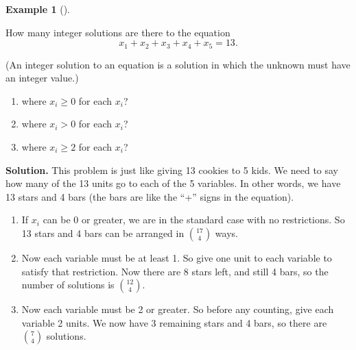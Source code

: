 \documentclass[10pt,]{book}
\theoremstyle{plain}
\theoremstyle{definition}
\newtheorem{example}[theorem]{Example}
\theoremstyle{definition}
\theoremstyle{definition}
\numberwithin{equation}{section}
\begin{document}
\begin{example}[]\label{example-44}

How many integer solutions are there to the equation
\begin{equation*}
  x_1 + x_2 + x_3 + x_4 + x_5 = 13.
\end{equation*}
%
\par

(An integer solution to an equation is a solution in which the unknown must have an integer value.)
%
\leavevmode%
\begin{enumerate}
\item\hypertarget{li-565}{}
where \(x_i \ge 0\) for each \(x_i\)?
%
\item\hypertarget{li-566}{}
where \(x_i > 0\) for each \(x_i\)?
%
\item\hypertarget{li-567}{}
where \(x_i \ge 2\) for each \(x_i\)?
%
\end{enumerate}
\par\medskip\noindent%
\textbf{Solution.}\quad 
This problem is just like giving 13 cookies to 5 kids. We need to say how many of the 13 units go to each of the 5 variables. In other words, we have 13 stars and 4 bars (the bars are like the ``+'' signs in the equation).
%
\leavevmode%
\begin{enumerate}
\item\hypertarget{li-568}{}
If \(x_i\) can be 0 or greater, we are in the standard case with no restrictions.  So 13 stars and 4 bars can be arranged in \({17 \choose 4}\) ways.
%
\item\hypertarget{li-569}{}
Now each variable must be at least 1.  So give one unit to each variable to satisfy that restriction.  Now there are 8 stars left, and still 4 bars, so the number of solutions is \({12 \choose 4}\).
%
\item\hypertarget{li-570}{}
Now each variable must be 2 or greater.  So before any counting, give each variable 2 units.  We now have 3 remaining stars and 4 bars, so there are \({7 \choose 4}\) solutions.
%
\end{enumerate}
\end{example}
\typeout{************************************************}
\typeout{************************************************}
\end{document}
